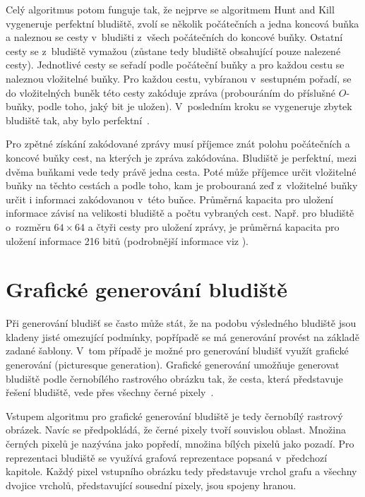 \documentclass[a4paper,12pt]{article}
\begin{document}
Celý algoritmus potom funguje tak, že nejprve se algoritmem Hunt and Kill vygeneruje perfektní bludiště, zvolí se několik
počátečních a jedna koncová buňka a naleznou se cesty v~bludišti z~všech počátečních do koncové buňky. Ostatní cesty se
z~bludiště vymažou (zůstane tedy bludiště obsahující pouze nalezené cesty). Jednotlivé cesty se seřadí podle počáteční buňky a 
pro každou cestu se naleznou vložitelné buňky. Pro každou cestu, vybíranou v~sestupném pořadí, se do vložitelných buněk této 
cesty zakóduje zpráva (probouráním do příslušné $O$-buňky, podle toho, jaký bit je uložen). V~posledním kroku se vygeneruje 
zbytek bludiště tak, aby bylo perfektní~\cite{Lee20102528}.

Pro zpětné získání zakódované zprávy musí příjemce znát polohu počátečních
a koncové buňky cest, na kterých je zpráva zakódována. Bludiště je perfektní, mezi dvěma buňkami vede tedy
právě jedna cesta. Poté může příjemce určit vložitelné buňky na těchto cestách a podle toho, kam je
probouraná zeď z~vložitelné buňky určit i informaci zakódovanou v~této buňce. Průměrná kapacita pro
uložení informace závisí na velikosti bludiště a počtu vybraných cest. Např. pro bludiště o~rozměru 
$64\times 64$ a čtyři cesty pro uložení zprávy, je průměrná kapacita pro uložení informace 216 bitů 
(podrobnější informace viz \cite{Lee20102528}). 

\newpage

\section{Grafické generování bludiště}
Při generování bludišť se často může stát, že na podobu výsledného bludiště jsou kladeny jisté omezující podmínky,
popřípadě se má generování provést na základě zadané šablony. V~tom případě je možné pro generování bludišť využít
grafické generování (picturesque generation). Grafické generování umožňuje generovat bludiště podle černobílého
rastrového obrázku tak, že cesta, která představuje řešení bludiště, vede přes všechny černé pixely~\cite{pic}.

Vstupem algoritmu pro grafické generování bludiště je tedy černobílý rastrový obrázek. Navíc se předpokládá, že černé pixely 
tvoří souvislou oblast. Množina černých pixelů je nazývána jako popředí, množina bílých pixelů jako pozadí. 
Pro reprezentaci bludiště se využívá grafová reprezentace popsaná v~předchozí kapitole. Každý pixel vstupního obrázku tedy 
představuje vrchol grafu a všechny dvojice vrcholů, představující sousední pixely, jsou spojeny hranou. 
\end{document}
